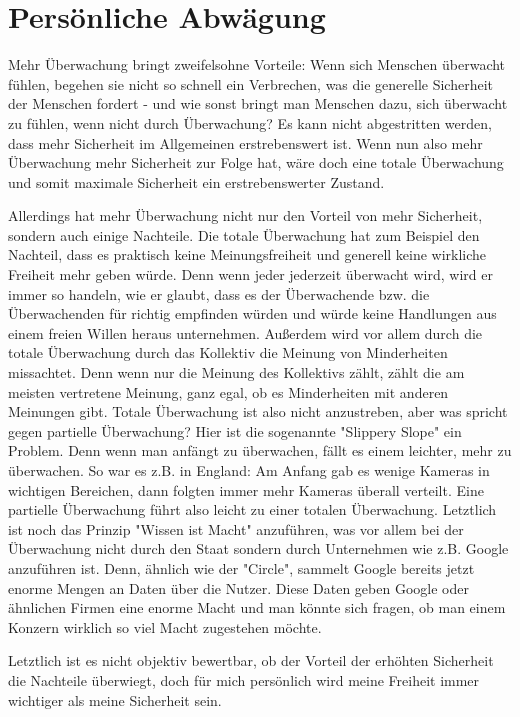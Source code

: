 \documentclass{article}
\begin{document}
\section{Persönliche Abwägung}
Mehr Überwachung bringt zweifelsohne Vorteile: Wenn sich Menschen überwacht fühlen, begehen sie nicht so schnell ein Verbrechen, was die generelle Sicherheit der Menschen fordert - und wie sonst bringt man Menschen dazu, sich überwacht zu fühlen, wenn nicht durch Überwachung? Es kann nicht abgestritten werden, dass mehr Sicherheit im Allgemeinen erstrebenswert ist. Wenn nun also mehr Überwachung mehr Sicherheit zur Folge hat, wäre doch eine totale Überwachung und somit maximale Sicherheit ein erstrebenswerter Zustand.

Allerdings hat mehr Überwachung nicht nur den Vorteil von mehr Sicherheit, sondern auch einige Nachteile. Die totale Überwachung hat zum Beispiel den Nachteil, dass es praktisch keine Meinungsfreiheit und generell keine wirkliche Freiheit mehr geben würde. Denn wenn jeder jederzeit überwacht wird, wird er immer so handeln, wie er glaubt, dass es der Überwachende bzw. die Überwachenden für richtig empfinden würden und würde keine Handlungen aus einem freien Willen heraus unternehmen. Außerdem wird vor allem durch die totale Überwachung durch das Kollektiv die Meinung von Minderheiten missachtet. Denn wenn nur die Meinung des Kollektivs zählt, zählt die am meisten vertretene Meinung, ganz egal, ob es Minderheiten mit anderen Meinungen gibt. Totale Überwachung ist also nicht anzustreben, aber was spricht gegen partielle Überwachung? Hier ist die sogenannte "Slippery Slope" ein Problem. Denn wenn man anfängt zu überwachen, fällt es einem leichter, mehr zu überwachen. So war es z.B. in England: Am Anfang gab es wenige Kameras in wichtigen Bereichen, dann folgten immer mehr Kameras überall verteilt. Eine partielle Überwachung führt also leicht zu einer totalen Überwachung.
Letztlich ist noch das Prinzip "Wissen ist Macht" anzuführen, was vor allem bei der Überwachung nicht durch den Staat sondern durch Unternehmen wie z.B. Google anzuführen ist. Denn, ähnlich wie der "Circle", sammelt Google bereits jetzt enorme Mengen an Daten über die Nutzer. Diese Daten geben Google oder ähnlichen Firmen eine enorme Macht und man könnte sich fragen, ob man einem Konzern wirklich so viel Macht zugestehen möchte.

Letztlich ist es nicht objektiv bewertbar, ob der Vorteil der erhöhten Sicherheit die Nachteile überwiegt, doch für mich persönlich wird meine Freiheit immer wichtiger als meine Sicherheit sein.
\end{document}
